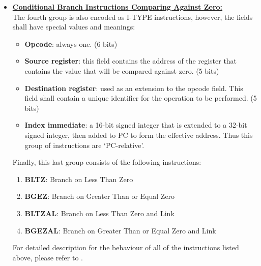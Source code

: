 \documentclass[oneside]{book}
\begin{document}
\begin{itemize}
\item \textbf{\underline{Conditional Branch Instructions
                         Comparing Against Zero:}} \\

The fourth group is also encoded as I-TYPE instructions,
however, the fields shall have special values and meanings:

\begin{itemize}

\item \textbf{Opcode}: always one. (6 bits)

\item \textbf{Source register}: this field contains the address of the
                                register that contains the value
                                that will be compared against zero. (5 bits)

\item \textbf{Destination register}: used as an extension to the opcode field.
                                     This field shall contain a unique
                                     identifier for the operation to be
                                     performed. (5 bits)

\item \textbf{Index immediate}: a 16-bit signed integer that is extended
                                to a 32-bit signed integer, then added
                                to PC to form the effective address. Thus
                                this group of instructions are `PC-relative'.

\end{itemize}

Finally, this last group consists of the following instructions:

\begin{enumerate}

\item \textbf{BLTZ}:   Branch on Less Than Zero
\item \textbf{BGEZ}:   Branch on Greater Than or Equal Zero
\item \textbf{BLTZAL}: Branch on Less Than Zero and Link
\item \textbf{BGEZAL}: Branch on Greater Than or Equal Zero and Link

\end{enumerate}

For detailed description for the behaviour of all of the instructions listed
above, please refer to \cite{mips_isa}.

\end{itemize}
\end{document}
